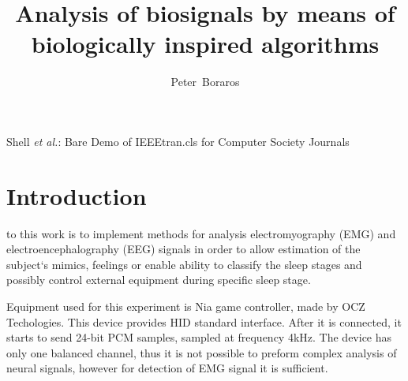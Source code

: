 \documentclass[a4paper,journal]{IEEEtran}
\begin{document}
\title{Analysis of biosignals by means of\\ biologically inspired algorithms}

\author{Peter~Boraros%
}



%
{Shell \MakeLowercase{\textit{et al.}}: Bare Demo of IEEEtran.cls for Computer Society Journals}


\maketitle
\IEEEdisplaynotcompsoctitleabstractindextext
\IEEEpeerreviewmaketitle


\section{Introduction}
 to this work is to implement methods for analysis 
electromyography (EMG) and electroencephalography (EEG) 
signals in order to allow estimation of the subject`s mimics, 
feelings or enable ability to classify the sleep stages and possibly control 
external equipment during specific sleep stage.

Equipment used for this experiment is {Nia game controller}, made by 
{OCZ Techologies}. This device provides HID standard interface.
After it is connected, it starts to send 24-bit PCM samples, 
sampled at frequency 4kHz. The device has only one balanced channel, thus 
it is not possible to preform complex analysis of neural signals,
however for detection of EMG signal it is sufficient.
\end{document}
